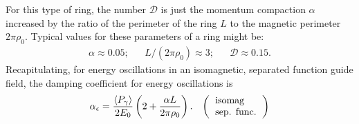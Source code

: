 For this type of ring, the number $\mathscr{D}$ is just the momentum compaction $\alpha$ increased by the ratio of the perimeter of the ring $L$ to the magnetic perimeter $2\pi\rho_0$. Typical values for these parameters of a ring might be:
\begin{align*}
	\alpha \approx 0.05; && L/(2\pi\rho_0)\approx 3; && \mathscr{D} \approx 0.15.
\end{align*}
Recapitulating, for energy oscillations in an isomagnetic, separated function guide field, the damping coefficient for energy oscillations is
\begin{align}
	\alpha_\epsilon = \dfrac{\mean{P_\gamma}}{2E_0}\left( 2 + \dfrac{\alpha L}{2 \pi \rho_0} \right). && \left(\begin{tabular}{l}
\text{isomag} \\
\text{sep. func.}
\end{tabular}\right)
\end{align}
